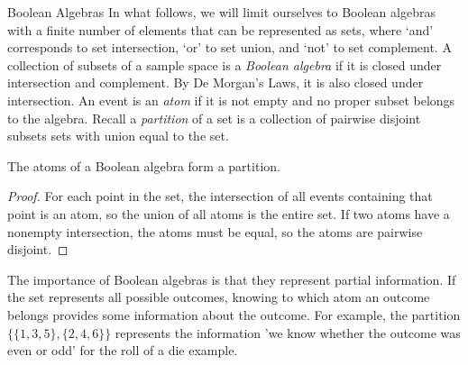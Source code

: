 \begin{section}{Boolean Algebras}
In what follows, we will limit ourselves to Boolean algebras with a finite number of
elements that can be represented as sets, where `and' corresponds to set intersection,
`or' to set union, and `not' to set complement. A collection of subsets of a
sample space is a
{\em Boolean algebra} if it is closed under intersection and complement. By De Morgan's
Laws, it is also closed under intersection. 
An event is an {\em atom} if it is not empty and no proper subset belongs to the algebra.
Recall a {\em partition} of a set is a collection of pairwise disjoint subsets sets with union
equal to the set.

\begin{lemma}
The atoms of a Boolean algebra form a partition.
\end{lemma}
\begin{proof}
For each point in the set, the intersection of all events containing that point is an atom,
so the union of all atoms is the entire set. If two atoms have a nonempty intersection,
the atoms must be equal, so the atoms are pairwise disjoint.
\end{proof}

The importance of Boolean algebras is that they represent partial information. If the
set represents all possible outcomes, knowing to which atom an outcome belongs provides
some information about the outcome. For example, the partition $\{\{1,3,5\},\{2,4,6\}\}$
represents the information 'we know whether the outcome was even or odd' for the
roll of a die example.

\end{section}

